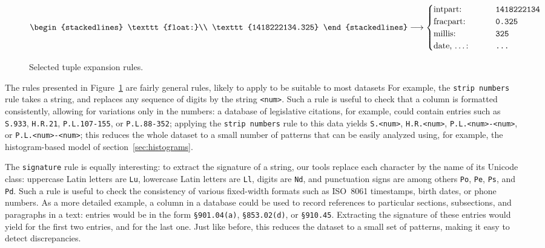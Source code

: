\begin{figure}[H]
   $\begin{stackedlines}
    \texttt{float:}\\
    \texttt{1418222134.325}
  \end{stackedlines} \longrightarrow
  \begin{cases}
    \text{intpart:} & \texttt{1418222134}\\
    \text{fracpart:} & \texttt{0.325}\\
    \text{millis:} & \texttt{325}\\
    \text{\parbox{\widthof{\largest}}{date, \ldots:}} & \texttt{\ldots}
  \end{cases}\hfill$

  \caption{Selected tuple expansion rules.}
  \label{fig:tuple-expansion}
\end{figure}

The rules presented in Figure~\ref{fig:tuple-expansion} are fairly general rules, likely to apply to be suitable to most datasets For example, the \texttt{strip numbers} rule takes a string, and replaces any sequence of digits by the string \texttt{<num>}. Such a rule is useful to check that a column is formatted consistently, allowing for variations only in the numbers: a database of legislative citations, for example, could contain entries such as \texttt{S.933}, \texttt{H.R.21}, \texttt{P.L.107-155}, or \texttt{P.L.88-352}; applying the \texttt{strip numbers} rule to this data yields \texttt{S.<num>}, \texttt{H.R.<num>}, \texttt{P.L.<num>-<num>}, or \texttt{P.L.<num>-<num>}; this reduces the whole dataset to a small number of patterns that can be easily analyzed using, for example, the histogram-based model of section~\ref{sec:histograms}.

The \texttt{signature} rule is equally interesting: to extract the signature of a string, our tools replace each character by the name of its Unicode class: uppercase Latin letters are \texttt{Lu}, lowercase Latin letters are \texttt{Ll}, digits are \texttt{Nd}, and punctuation signs are among others \texttt{Po}, \texttt{Pe}, \texttt{Ps}, and \texttt{Pd}. Such a rule is useful to check the consistency of various fixed-width formats such as ISO~8061 timestamps, birth dates, or phone numbers. As a more detailed example, a column in a database could be used to record references to particular sections, subsections, and paragraphs in a text: entries would be in the form \texttt{\S901.04(a)}, \texttt{\S853.02(d)}, or \texttt{\S910.45}. Extracting the signature of these entries would yield  for the first two entries, and  for the last one. Just like before, this reduces the dataset to a small set of patterns, making it easy to detect discrepancies. %
